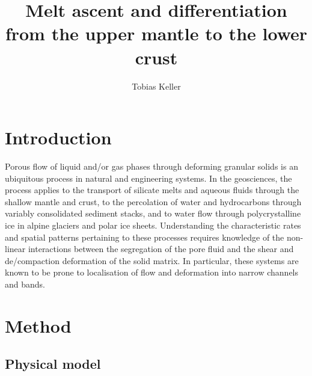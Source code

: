 \documentclass[12pt,a4paper]{article}
\title{Melt ascent and differentiation from the upper mantle to the lower crust}
\author{Tobias Keller}
\begin{document}
\maketitle \linenumbers \doublespace

\section{Introduction}
Porous flow of liquid and/or gas phases through deforming granular solids is an ubiquitous process in natural and engineering systems. In the geosciences, the process applies to the transport of silicate melts and aqueous fluids through the shallow mantle and crust, to the percolation of water and hydrocarbons through variably consolidated sediment stacks, and to water flow through polycrystalline ice in alpine glaciers and polar ice sheets. Understanding the characteristic rates and spatial patterns pertaining to these processes requires knowledge of the non-linear interactions between the segregation of the pore fluid and the shear and de/compaction deformation of the solid matrix. In particular, these systems are known to be prone to localisation of flow and deformation into narrow channels and bands.



\section{Method}

\subsection{Physical model}
\end{document}
